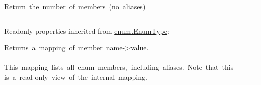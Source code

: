 \begin{longtable}[]
\begin{minipage}[t]{\linewidth}
\begin{longtable}[]
\begin{minipage}[t]{\linewidth}
\begin{description}
\tightlist
\item[\protect\hypertarget{shotType-__len__}{}{\textbf{\_\_len\_\_}}(){{
from \href{enum.html\#EnumType}{enum.EnumType}}}]
{Return~the~number~of~members~(no~aliases)}
\end{description}

\begin{center}\rule{0.5\linewidth}{0.5pt}\end{center}

Readonly properties inherited from
\href{enum.html\#EnumType}{enum.EnumType}:\\

\begin{description}
\tightlist
\item[\textbf{\_\_members\_\_}]
{Returns~a~mapping~of~member~name-\textgreater value.\\
\hspace*{0.333em}\\
This~mapping~lists~all~enum~members,~including~aliases.~Note~that~this\\
is~a~read-only~view~of~the~internal~mapping.}
\end{description}\strut
\end{minipage} \\
\bottomrule
\end{longtable}\strut
\end{minipage} \\
\bottomrule
\end{longtable}

